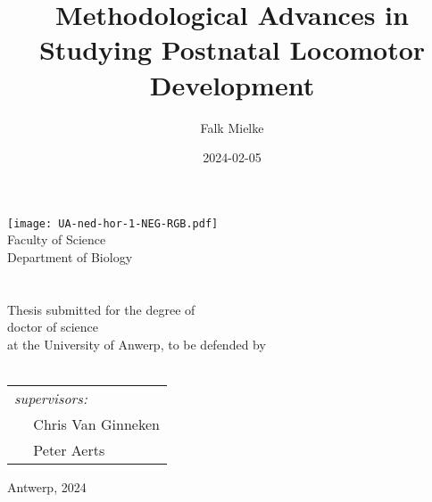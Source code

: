 \documentclass[12pt,a4paper,twoside]{report}
\title{Methodological Advances \linebreak in \linebreak Studying Postnatal Locomotor Development}
\author{Falk Mielke}
\date{2024-02-05}
\newcommand{\setbackgroundcolour}{\pagecolor[rgb]{0.10,0.10,0.10}}
\newcommand{\settextcolour}{\color[rgb]{1.0,1.0,1.0}}
\newcommand{\invertbackgroundtext}{\setbackgroundcolour\settextcolour}
\begin{document}
\doublespacing
\makeatletter
    \begin{titlepage}  
    \invertbackgroundtext
    \begin{spacing}{2}
        \begin{center}
            {\texttt{[image: UA-ned-hor-1-NEG-RGB.pdf]}\\[4ex]}
            {\vspace*{-1.0cm} Faculty of Science \\ \vspace*{-0.4cm} Department of Biology}
            \ \vspace{\fill}\\
            {\LARGE \bfseries  \@title }\\[6ex]
            \ \vspace{1cm}\\
            Thesis submitted for the degree of 
            \\ doctor of science 
            \\ at the University of Anwerp, to be defended by
            {\\\large  \@author}\\[8ex]
        \end{center}
        \vspace*{\fill}
        \begin{flushleft}
            \begin{tabular}{ l}
              \textit{supervisors:}
               \\\(\quad\) Chris Van Ginneken
               \\\(\quad\) Peter Aerts
            \end{tabular}
        \end{flushleft}
        \vspace*{-1.55cm}
        \begin{flushright}
          Antwerp, 2024
        \end{flushright}
        \end{spacing}
    \end{titlepage}
\makeatother
\thispagestyle{empty}
\newpage
\end{document}

